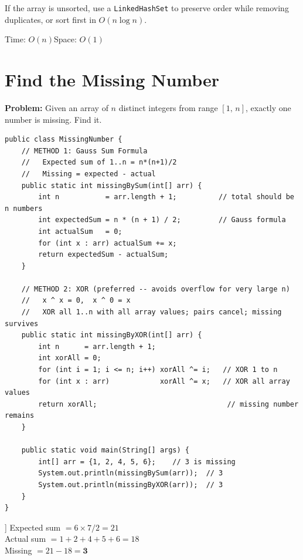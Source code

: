 \documentclass[12pt,a4paper,oneside]{book}
\begin{document}
\begin{warningbox}
If the array is unsorted, use a \texttt{LinkedHashSet} to preserve order while removing duplicates, or sort first in $O(n \log n)$.
\end{warningbox}

\begin{complexity}
Time: $O(n)$\quad Space: $O(1)$
\end{complexity}

\section{Find the Missing Number}

\textbf{Problem:} Given an array of $n$ distinct integers from range $[1,\, n]$, exactly one number is missing. Find it.

\begin{lstlisting}[caption={Missing Number --- Sum Formula and XOR (both shown)}]
public class MissingNumber {
    // METHOD 1: Gauss Sum Formula
    //   Expected sum of 1..n = n*(n+1)/2
    //   Missing = expected - actual
    public static int missingBySum(int[] arr) {
        int n           = arr.length + 1;          // total should be n numbers
        int expectedSum = n * (n + 1) / 2;         // Gauss formula
        int actualSum   = 0;
        for (int x : arr) actualSum += x;
        return expectedSum - actualSum;
    }

    // METHOD 2: XOR (preferred -- avoids overflow for very large n)
    //   x ^ x = 0,  x ^ 0 = x
    //   XOR all 1..n with all array values; pairs cancel; missing survives
    public static int missingByXOR(int[] arr) {
        int n      = arr.length + 1;
        int xorAll = 0;
        for (int i = 1; i <= n; i++) xorAll ^= i;   // XOR 1 to n
        for (int x : arr)            xorAll ^= x;   // XOR all array values
        return xorAll;                               // missing number remains
    }

    public static void main(String[] args) {
        int[] arr = {1, 2, 4, 5, 6};    // 3 is missing
        System.out.println(missingBySum(arr));  // 3
        System.out.println(missingByXOR(arr));  // 3
    }
}
\end{lstlisting}

\begin{dryrun}[Sum Method: arr = \{1, 2, 4, 5, 6\}, range [1..6]]
Expected sum $= 6 \times 7 / 2 = 21$\\
Actual sum $= 1 + 2 + 4 + 5 + 6 = 18$\\
Missing $= 21 - 18 = \mathbf{3}$
\end{dryrun}
\end{document}

